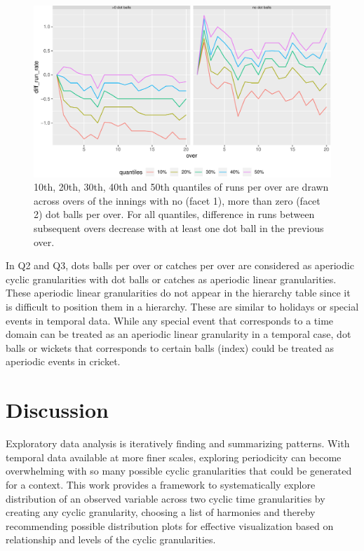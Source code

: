 \documentclass[12pt]{article}
\begin{document}
\begin{figure}[ht]

{\centering \includegraphics[width=\textwidth]{figure/exdot-1} 

}

\caption{10th, 20th, 30th, 40th and 50th quantiles of runs per over are drawn  across overs of the innings with no (facet 1), more than zero (facet 2) dot balls per over. For all quantiles, difference in runs between subsequent overs decrease with at least one dot ball in the previous over.}\label{fig:exdot}
\end{figure}

In Q2 and Q3, dots balls per over or catches per over are considered as aperiodic cyclic granularities with dot balls or catches as aperiodic linear granularities. These aperiodic linear granularities do not appear in the hierarchy table since it is difficult to position them in a hierarchy. These are similar to holidays or special events in temporal data. While any special event that corresponds to a time domain can be treated as an aperiodic linear granularity in a temporal case, dot balls or wickets that corresponds to certain balls (index) could be treated as aperiodic events in cricket.

\hypertarget{sec:discussion}{%
\section{Discussion}\label{sec:discussion}}

Exploratory data analysis is iteratively finding and summarizing patterns. With temporal data available at more finer scales, exploring periodicity can become overwhelming with so many possible cyclic granularities that could be generated for a context. This work provides a framework to systematically explore distribution of an observed variable across two cyclic time granularities by creating any cyclic granularity, choosing a list of harmonies and thereby recommending possible distribution plots for effective visualization based on relationship and levels of the cyclic granularities.
\end{document}
